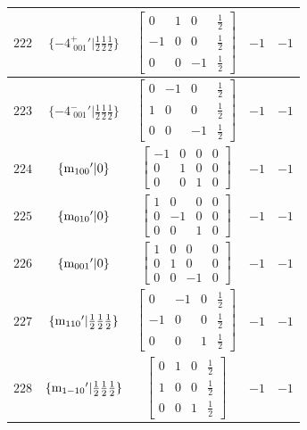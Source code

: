 \documentclass[fleqn,8pt]{jsarticle}
\begin{document}
\begin{longtable}{ccccc}
$ 222 $ & $ \{-4^{+}_{\,\,001}{}'|\frac{1}{2} \frac{1}{2} \frac{1}{2}\} $ & $ \begin{bmatrix} 0 & 1 & 0 & \frac{1}{2} \\ -1 & 0 & 0 & \frac{1}{2} \\ 0 & 0 & -1 & \frac{1}{2} \end{bmatrix} $ & $ -1 $ & $ -1 $ \\ \hline
$ 223 $ & $ \{-4^{-}_{\,\,001}{}'|\frac{1}{2} \frac{1}{2} \frac{1}{2}\} $ & $ \begin{bmatrix} 0 & -1 & 0 & \frac{1}{2} \\ 1 & 0 & 0 & \frac{1}{2} \\ 0 & 0 & -1 & \frac{1}{2} \end{bmatrix} $ & $ -1 $ & $ -1 $ \\ \hline
$ 224 $ & $ \{{\rm m}_{100}{}'|0\} $ & $ \begin{bmatrix} -1 & 0 & 0 & 0 \\ 0 & 1 & 0 & 0 \\ 0 & 0 & 1 & 0 \end{bmatrix} $ & $ -1 $ & $ -1 $ \\ \hline
$ 225 $ & $ \{{\rm m}_{010}{}'|0\} $ & $ \begin{bmatrix} 1 & 0 & 0 & 0 \\ 0 & -1 & 0 & 0 \\ 0 & 0 & 1 & 0 \end{bmatrix} $ & $ -1 $ & $ -1 $ \\ \hline
$ 226 $ & $ \{{\rm m}_{001}{}'|0\} $ & $ \begin{bmatrix} 1 & 0 & 0 & 0 \\ 0 & 1 & 0 & 0 \\ 0 & 0 & -1 & 0 \end{bmatrix} $ & $ -1 $ & $ -1 $ \\ \hline
$ 227 $ & $ \{{\rm m}_{110}{}'|\frac{1}{2} \frac{1}{2} \frac{1}{2}\} $ & $ \begin{bmatrix} 0 & -1 & 0 & \frac{1}{2} \\ -1 & 0 & 0 & \frac{1}{2} \\ 0 & 0 & 1 & \frac{1}{2} \end{bmatrix} $ & $ -1 $ & $ -1 $ \\ \hline
$ 228 $ & $ \{{\rm m}_{1-10}{}'|\frac{1}{2} \frac{1}{2} \frac{1}{2}\} $ & $ \begin{bmatrix} 0 & 1 & 0 & \frac{1}{2} \\ 1 & 0 & 0 & \frac{1}{2} \\ 0 & 0 & 1 & \frac{1}{2} \end{bmatrix} $ & $ -1 $ & $ -1 $ \\ \hline

\end{longtable}
\end{document}

